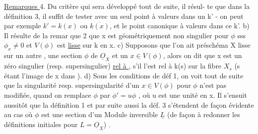 
\uline{Remarques }4.  Du  critère qui sera développé tout de suite, il résul-%
te que dans la définition 3, il suffit de tester avec un seul point
à valeurs dans un k' - on peut par exemple  $k'=k(x)$ ou $\overline{k(x)}$, et
le point canonique à valeurs dans ce k'. b) Il résulte de la remar
que 2 que x est géométriquement non singulier pour $\phi$ sss $\phi_x \neq 0$ et
$V(\phi)$ est \uline{lisse} sur k en x. c) Supposons que l'on ait  préschéma X lisse
sur un autre , une section $\phi$ de $\underline{O}_X$ et un $x \in V(\phi)$, alors on dit que x
est un zéro singulier (resp. supersingulier) \uline{rel à }, s'il l'est
rel à k(s) sur la fibre $X_s$ (s étant l'image de x dans ). d) Sous
les conditions de déf 1, on voit tout de suite que la singularité resp.
 supersingularité d'un $x \in V(\phi)$ pour $\phi$ n'est pas modifiée, quand on
remplace $\phi$ par $\phi'=u\phi$ , où u est une unité en x. Il s'ensuit aussitôt que
la  définition 1 et par suite aussi la déf. 3 s'étendent de façon
évidente au cas où $\phi$ est une section d'un Module inversible $\underline{L}$ (de façon
à redonner les définitions initiales pour $L = \underline{O}_X$) .

